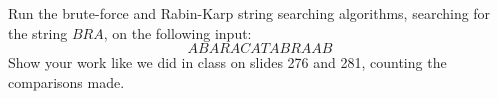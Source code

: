 Run the brute-force and Rabin-Karp string searching algorithms, searching
for the string $BRA$, on the following input:
$$ABARACATABRAAB$$
Show your work like we did in class on slides 276 and 281, counting
the comparisons made.
